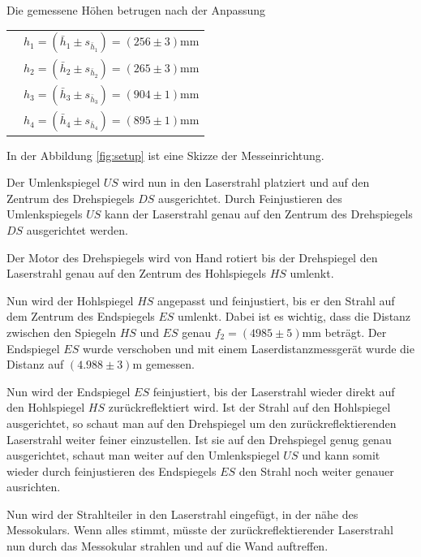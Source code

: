 Die gemessene H\"ohen betrugen nach der Anpassung

\begin{tabular}{ll}
    \hspace{4mm}
    & $h_1 = (\bar{h}_1 \pm s_{\bar{h}_1}) = (256\pm3)\textrm{mm}$ \\
    & $h_2 = (\bar{h}_2 \pm s_{\bar{h}_2}) = (265\pm3)\textrm{mm}$ \\
    & $h_3 = (\bar{h}_3 \pm s_{\bar{h}_3}) = (904\pm1)\textrm{mm}$ \\
    & $h_4 = (\bar{h}_4 \pm s_{\bar{h}_4}) = (895\pm1)\textrm{mm}$ \\
\end{tabular}

In   der   Abbildung   \ref{fig:setup}  ist  eine  Skizze  der  Messeinrichtung.

Der Umlenkspiegel $US$ wird nun in den Laserstrahl platziert und auf den Zentrum
des  Drehspiegels $DS$ ausgerichtet. Durch Feinjustieren des Umlenkspiegels $US$
kann  der  Laserstrahl  genau auf den Zentrum des Drehspiegels $DS$ ausgerichtet
werden.

Der  Motor  des  Drehspiegels  wird  von  Hand  rotiert  bis der Drehspiegel den
Laserstrahl   genau   auf   den   Zentrum   des   Hohlspiegels   $HS$   umlenkt.

Nun  wird der Hohlspiegel $HS$ angepasst und feinjustiert, bis er den Strahl auf
dem Zentrum des Endspiegels $ES$ umlenkt. Dabei ist es wichtig, dass die Distanz
zwischen  den  Spiegeln  $HS$  und  $ES$  genau  $f_2  =  (4985\pm5)\textrm{mm}$
betr\"agt.    Der    Endspiegel    $ES$   wurde   verschoben   und   mit   einem
Laserdistanzmessger\"at  wurde die Distanz auf $(4.988\pm3)\textrm{m}$ gemessen.

Nun wird der Endspiegel $ES$ feinjustiert, bis der Laserstrahl wieder direkt auf
den   Hohlspiegel   $HS$  zur\"uckreflektiert  wird.  Ist  der  Strahl  auf  den
Hohlspiegel   ausgerichtet,   so   schaut   man   auf  den  Drehspiegel  um  den
zur\"uckreflektierenden  Laserstrahl weiter feiner einzustellen. Ist sie auf den
Drehspiegel  genug  genau  ausgerichtet, schaut man weiter auf den Umlenkspiegel
$US$  und  kann somit wieder durch feinjustieren des Endspiegels $ES$ den Strahl
noch weiter genauer ausrichten.

Nun  wird  der  Strahlteiler  in  den Laserstrahl eingef\"ugt, in der n\"ahe des
Messokulars. Wenn alles stimmt, m\"usste der zur\"uckreflektierender Laserstrahl
nun   durch   das   Messokular   strahlen   und   auf   die   Wand   auftreffen.

